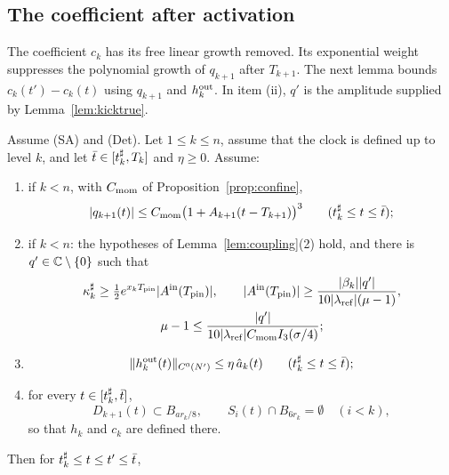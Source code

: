 \subsection{The coefficient after activation}
\label{sec:relay-coefficient}

The coefficient $c_k$ has its free linear growth removed. Its exponential
weight suppresses the polynomial growth of $q_{k+1}$ after $T_{k+1}$.
The next lemma bounds $c_k(t')-c_k(t)$ using $q_{k+1}$ and $h^{\mathrm{out}}_k$.
In item (ii), $q'$ is the amplitude supplied by Lemma~\ref{lem:kicktrue}.

\begin{lemma}
\label{lem:drift}
Assume (SA) and (Det). Let $1\le k\le n$, assume that the clock is defined up to
level $k$, and let $\bar t\in[t^\sharp_k,T_k]$ and $\eta\ge0$. Assume:
\begin{enumerate}[label=\textup{(\roman*)}]
\item if $k<n$, with $C_{\mathrm{mom}}$ of Proposition~\ref{prop:confine},
  \begin{equation}
  \label{eq:drift-moment}
  |q_{k+1}(t)|\le C_{\mathrm{mom}}\big(1+A_{k+1}(t-T_{k+1})\big)^3
  \qquad(t^\sharp_k\le t\le\bar t);
  \end{equation}
\item if $k<n$: the hypotheses of Lemma~\ref{lem:coupling}\textup{(2)} hold,
  and there is $q'\in\mathbb{C}\setminus\{0\}$ such that
  \begin{equation}
  \label{eq:drift-startup}
  \begin{gathered}
  \kappa^\sharp_k\ge\tfrac12e^{x_kT_{\mathrm{pin}}}|A^{\mathrm{in}}(T_{\mathrm{pin}})|,\qquad
  |A^{\mathrm{in}}(T_{\mathrm{pin}})|\ge\frac{|\beta_k||q'|}{10|\lambda_{\mathrm{ref}}|(\mu-1)},\\
  \mu-1\le\frac{|q'|}{10|\lambda_{\mathrm{ref}}|C_{\mathrm{mom}}I_{3}(\sigma/4)};
  \end{gathered}
  \end{equation}
\item
  \begin{equation}
  \label{eq:drift-outer}
  \|h^{\mathrm{out}}_k(t)\|_{C^0(N')}\le\eta\,\hat a_k(t)
  \qquad(t^\sharp_k\le t\le\bar t);
  \end{equation}
\item for every $t\in[t^\sharp_k,\bar t]$,
  \begin{equation}
  \label{eq:drift-support}
  D_{k+1}(t)\subset B_{ar_k/8},\qquad
  S_i(t)\cap B_{6r_k}=\emptyset\quad(i<k),
  \end{equation}
  so that $h_k$ and $c_k$ are defined there.
\end{enumerate}
Then for $t^\sharp_k\le t\le t'\le\bar t$,
\begin{equation}

\end{equation}
\end{lemma}
